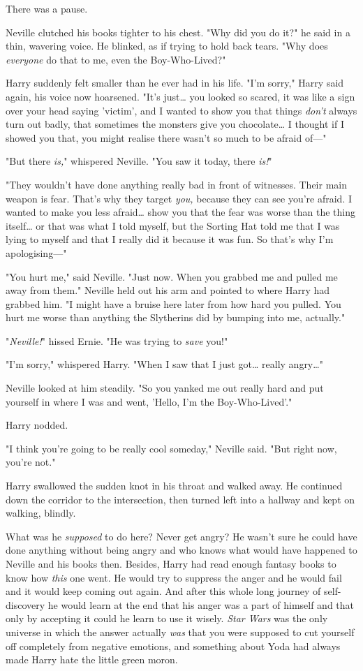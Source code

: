 There was a pause.

Neville clutched his books tighter to his chest. "Why did you do it?" he said 
in a thin, wavering voice. He blinked, as if trying to hold back tears. "Why 
does \emph{everyone} do that to me, even the Boy-Who-Lived?"

Harry suddenly felt smaller than he ever had in his life. "I'm sorry," Harry 
said again, his voice now hoarsened. "It's just{\ldots} you looked so scared, 
it was like a sign over your head saying 'victim', and I wanted to show you 
that things \emph{don't} always turn out badly, that sometimes the monsters 
give you chocolate{\ldots} I thought if I showed you that, you might realise 
there wasn't so much to be afraid of---"

"But there \emph{is,}" whispered Neville. "You saw it today, there \emph{is!}"

"They wouldn't have done anything really bad in front of witnesses. Their main 
weapon is fear. That's why they target \emph{you,} because they can see you're 
afraid. I wanted to make you less afraid{\ldots} show you that the fear was 
worse than the thing itself{\ldots} or that was what I told myself, but the 
Sorting Hat told me that I was lying to myself and that I really did it because 
it was fun. So that's why I'm apologising---"

"You hurt me," said Neville. "Just now. When you grabbed me and pulled me away 
from them." Neville held out his arm and pointed to where Harry had grabbed 
him. "I might have a bruise here later from how hard you pulled. You hurt me 
worse than anything the Slytherins did by bumping into me, actually."

"\emph{Neville!}" hissed Ernie. "He was trying to \emph{save} you!"

"I'm sorry," whispered Harry. "When I saw that I just got{\ldots} really 
angry{\ldots}"

Neville looked at him steadily. "So you yanked me out really hard and put 
yourself in where I was and went, 'Hello, I'm the Boy-Who-Lived'."

Harry nodded.

"I think you're going to be really cool someday," Neville said. "But right now, 
you're not."

Harry swallowed the sudden knot in his throat and walked away. He continued 
down the corridor to the intersection, then turned left into a hallway and kept 
on walking, blindly.

What was he \emph{supposed} to do here? Never get angry? He wasn't sure he 
could have done anything without being angry and who knows what would have 
happened to Neville and his books then. Besides, Harry had read enough fantasy 
books to know how \emph{this} one went. He would try to suppress the anger and 
he would fail and it would keep coming out again. And after this whole long 
journey of self-discovery he would learn at the end that his anger was a part 
of himself and that only by accepting it could he learn to use it wisely. 
\emph{Star Wars} was the only universe in which the answer actually \emph{was} 
that you were supposed to cut yourself off completely from negative emotions, 
and something about Yoda had always made Harry hate the little green moron.

